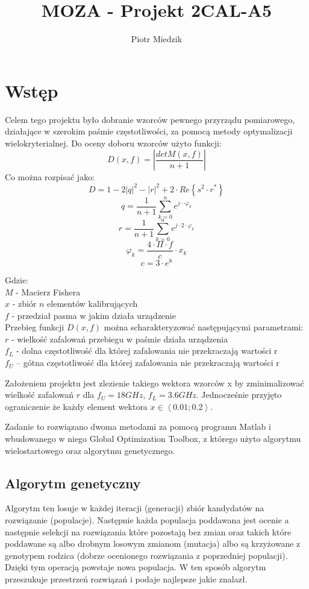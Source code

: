 \documentclass[10pt,a4paper]{article}
\author{Piotr Miedzik}
\title{MOZA - Projekt 2CAL-A5}
\begin{document}
\maketitle

\listoftodos
\section{Wstęp}
Celem tego projektu było dobranie wzorców pewnego przyrządu pomiarowego, działające w szerokim paśmie częstotliwości, za pomocą metody optymalizacji wielokryterialnej. Do oceny doboru wzorców użyto funkcji:
\[
D(x,f)=|\frac{detM(x,f)}{n+1}|
\]
Co można rozpisać jako:
\[
D = 1-2 |q|^2 - |r|^2 + 2 \cdot Re\left\lbrace s^2 \cdot r^*\right\rbrace
\]
\[
q=\frac{1}{n+1} \sum^n_{k=0}{ e^{j\cdot \cdot \varphi_k}}
\]
\[
r=\frac{1}{n+1} \sum^n_{k=0}{ e^{j\cdot 2\cdot \varphi_k}}
\]
\[
\varphi_k = \frac{4 \cdot \Pi \cdot f}{c} \cdot x_k
\]
\[
c = 3 \cdot e^{8}
\]

Gdzie:\\
$M$ - Macierz Fishera\\
$x$ - zbiór $n$ elementów kalibrujących\\
$f$ - przedział pasma w jakim działa urządzenie\\

Przebieg funkcji $D(x,f)$ można scharakteryzować następującymi parametrami:\\
$r$ - wielkość zafalowań przebiegu w paśmie działa urządzenia\\
$f_L$ - dolna częstotliwość dla której zafalowania nie przekraczają wartości r\\
$f_U$ – gótna częstotliwość dla której zafalowania nie przekraczają wartości r

Założeniem projektu jest zlezienie takiego wektora wzorców x by zminimalizować wielkość zafalowań $r$ dla $f_U=18GHz$, $f_L=3.6GHz$. Jednocześnie przyjęto ograniczenie że każdy element wektora $x \in \left\langle 0.01;0.2 \right\rangle$.

Zadanie to rozwiązano dwoma metodami za pomocą programu Matlab i wbudowanego w niego Global Optimization Toolbox, z którego użyto algorytmu wielostartowego oraz algorytmu genetycznego.
\subsection{Algorytm genetyczny}
Algorytm ten losuje w każdej iteracji (generacji) zbiór kandydatów na rozwiązanie (populacje). Następnie każda populacja poddawana jest ocenie a następnie selekcji na rozwiązania które pozostają bez zmian oraz takich które poddawane są albo drobnym losowym zmianom (mutacja) albo są krzyżowane z genotypem rodzica (dobrze ocenionego rozwiązania z poprzedniej populacji). Dzięki tym operacją powstaje nowa populacja.  W ten sposób algorytm przeszukuje przestrzeń rozwiązań i podaje najlepsze jakie znalazł.
\end{document}
